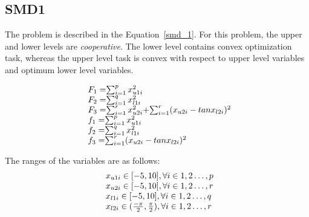 \subsection{SMD1}

The problem is described in the Equation~\ref{smd_1}. For this problem, the upper and lower levels are \emph{cooperative}. The lower level contains convex optimization task, whereas the upper level task is convex with respect to upper level variables and optimum lower level variables. 

\begin{equation}
\begin{array}{lr}
\text{}\hspace{2mm} F_1=$$\sum_{	i=1}^{p} x_{u1i}^{2} $$\\
\text{}\hspace{2mm} F_2=$$\sum_{	i=1}^{q} x_{l1i}^{2} $$\\
\text{}\hspace{2mm} F_3=$$\sum_{	i=1}^{r} x_{u2i}^{2} $$+$$\sum_{	i=1}^{r} (x_{u2i}-tan x_{l2i})^{2} $$\\

\text{}\hspace{2mm} f_1=$$\sum_{	i=1}^{p} x_{u1i}^{2} $$\\
\text{}\hspace{2mm} f_2=$$\sum_{	i=1}^{q} x_{l1i}^{2} $$\\
\text{}\hspace{2mm} f_3=$$\sum_{	i=1}^{r} (x_{u2i}-tan x_{l2i})^{2} $$\\

\end{array}
\label{smd_1}
\end{equation}

The ranges of the variables are as follows:
\begin{equation}
\begin{array}{lr}


\hspace{2mm}    $$x_{u1i} \in  [-5,10],          \forall i \in {1,2\ldots,p}$$\\
\hspace{2mm}	$$x_{u2i} \in  [-5,10],          \forall i \in {1,2\ldots,r}$$\\
\hspace{2mm}		$$x_{l1i} \in  [-5,10],          \forall i \in {1,2\ldots,q}$$\\
\hspace{2mm}	$$x_{l2i} \in  (\frac{-\pi}{2},\frac{\pi}{2}),          \forall i \in {1,2\ldots,r}$$
\end{array}
\label{smd_eqn1}
\end{equation}

